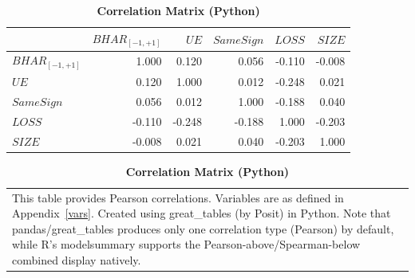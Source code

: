 \documentclass[english,12pt]{article}
\begin{document}
\begin{table}[htbp]\centering\footnotesize{
\renewcommand{\arraystretch}{1.5}
\caption{\textbf{Correlation Matrix (Python)} \label{tab:corr-py}}

\begin{tabular*}{\linewidth}{@{\extracolsep{\fill}}lrrrrr}
\toprule
  & $BHAR_{[-1,+1]}$ & $UE$ & $SameSign$ & $LOSS$ & $SIZE$ \\
\midrule\addlinespace[2.5pt]
$BHAR_{[-1,+1]}$ & 1.000 & 0.120 & 0.056 & -0.110 & -0.008 \\
$UE$ & 0.120 & 1.000 & 0.012 & -0.248 & 0.021 \\
$SameSign$ & 0.056 & 0.012 & 1.000 & -0.188 & 0.040 \\
$LOSS$ & -0.110 & -0.248 & -0.188 & 1.000 & -0.203 \\
$SIZE$ & -0.008 & 0.021 & 0.040 & -0.203 & 1.000 \\
\bottomrule
\end{tabular*}

\vspace{-1.5\baselineskip}
\singlespace
\flushleft
\begin{tabular}{@{}p{\linewidth}@{}}
\footnotesize
This table provides Pearson correlations. Variables are as defined in Appendix~\ref{vars}. Created using great\_tables (by Posit) in Python. Note that pandas/great\_tables produces only one correlation type (Pearson) by default, while R's modelsummary supports the Pearson-above/Spearman-below combined display natively.
\end{tabular}
}
\end{table}


\clearpage\newpage

\end{document}
